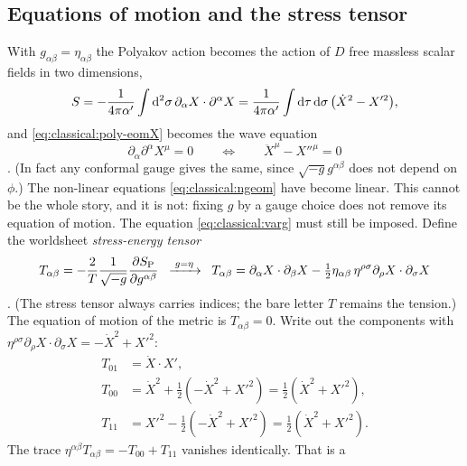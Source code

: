\subsection{Equations of motion and the stress tensor}

With $g_{\alpha\beta}=\eta_{\alpha\beta}$ the Polyakov action becomes the action of $D$ free
massless scalar fields in two dimensions,
\begin{equation}\label{eq:classical:freeaction}
  S=-\frac{1}{4\pi\alpha'}\int\mathrm{d}^2\sigma\,\partial_\alpha X\cdot\partial^\alpha X
   =\frac{1}{4\pi\alpha'}\int\mathrm{d}\tau\,\mathrm{d}\sigma\,\big(\dot X^2-X'^2\big),
\end{equation}
and \eqref{eq:classical:poly-eomX} becomes the wave equation
\begin{equation}\label{eq:classical:wave}
  \partial_\alpha\partial^\alpha X^\mu=0\qquad\Longleftrightarrow\qquad \ddot X^\mu-X''^\mu=0
\end{equation}
. (In fact any conformal gauge gives the same, since
$\sqrt{-g}g^{\alpha\beta}$ does not depend on $\phi$.) The non-linear equations
\eqref{eq:classical:ngeom} have become linear. This cannot be the whole story, and it is not:
fixing $g$ by a gauge choice does not remove its equation of motion. The equation
\eqref{eq:classical:varg} must still be imposed. Define the worldsheet
\emph{stress-energy tensor}
\begin{equation}\label{eq:classical:Tdef}
  T_{\alpha\beta}=-\frac{2}{T}\frac{1}{\sqrt{-g}}\frac{\partial S_{\rm P}}{\partial g^{\alpha\beta}}
  \;\;\xrightarrow{\;g=\eta\;}\;\;
  T_{\alpha\beta}=\partial_\alpha X\cdot\partial_\beta X-\tfrac12\eta_{\alpha\beta}\,\eta^{\rho\sigma}\partial_\rho X\cdot\partial_\sigma X
\end{equation}
. (The stress tensor always carries indices; the bare
letter $T$ remains the tension.) The equation of motion of the metric is
$T_{\alpha\beta}=0$. Write out the components with $\eta^{\rho\sigma}\partial_\rho
X\cdot\partial_\sigma X=-\dot X^2+X'^2$:
\begin{align}
  T_{01}&=\dot X\cdot X', \nonumber\\
  T_{00}&=\dot X^2+\tfrac12(-\dot X^2+X'^2)=\tfrac12(\dot X^2+X'^2),\label{eq:classical:Tcomp}\\
  T_{11}&=X'^2-\tfrac12(-\dot X^2+X'^2)=\tfrac12(\dot X^2+X'^2). \nonumber
\end{align}
The trace $\eta^{\alpha\beta}T_{\alpha\beta}=-T_{00}+T_{11}$ vanishes identically. That is a
